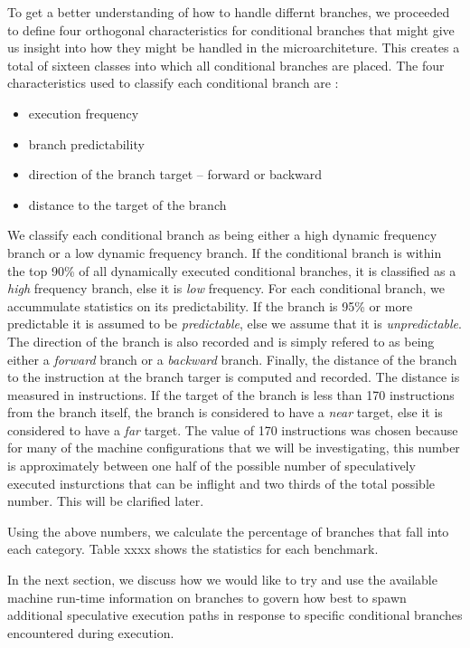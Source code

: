 \documentclass[10pt,dvips]{article}
\begin{document}
To get a better understanding of how to handle differnt branches,
we proceeded to define four orthogonal characteristics
for conditional branches that might give us insight into
how they might be handled in the microarchiteture.
This creates a total of sixteen classes into which all conditional 
branches are placed.
The four characteristics used to classify each conditional branch are :

\begin{itemize}
\item{execution frequency}
\item{branch predictability}
\item{direction of the branch target -- forward or backward}
\item{distance to the target of the branch}
\end{itemize}   

We classify each conditional branch as 
being either a high dynamic frequency branch
or a low dynamic frequency branch.  If the conditional branch
is within the top 90\% of all dynamically executed conditional branches,
it is classified as a \textit{high} frequency branch, else it 
is \textit{low} frequency.
For each conditional branch, we accummulate statistics on
its predictability.  If the branch is 95\% or more predictable
it is assumed to be 
\textit{predictable}, else we assume that it is
\textit{unpredictable}.
The direction of the branch is also recorded and is simply
refered to as being either a 
\textit{forward} branch or a 
\textit{backward} branch.
Finally, the distance of the branch to 
the instruction at the
branch targer is computed and recorded.  The distance is measured
in instructions.  If the target of the branch is less than 170 instructions
from the branch itself, the branch is considered to have a 
\textit{near} target, else it is considered to have a
\textit{far} target.  The value of 170 instructions was chosen
because for many of the machine configurations that we will be
investigating, this number is approximately between one half of
the possible number of speculatively executed insturctions
that can be inflight and two thirds of the total possible number.
This will be clarified later.

Using the above numbers, we calculate the percentage of branches 
that fall into each category.  
Table xxxx shows the statistics for each benchmark.  



In the next section, we discuss how we would like to try and
use the available machine run-time information on branches to
govern how best to spawn additional speculative execution paths
in response to specific conditional branches encountered during execution.
%
\end{document}
